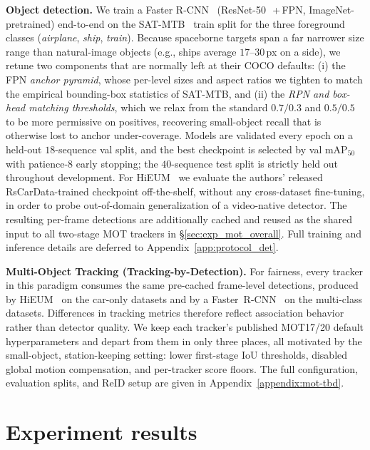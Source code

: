 \documentclass{article}
\newcommand{\subhead}[1]{\noindent\textbf{#1.}}
\begin{document}
\subhead{Object detection} We train a Faster R-CNN~\citep{ren2015fasterrcnn} (ResNet-50~\citep{he2016resnet}\,+\,FPN, ImageNet-pretrained)
end-to-end on the SAT-MTB~\citep{Li2023SATMTB} train split for the three foreground classes (\emph{airplane}, \emph{ship}, \emph{train}).
Because spaceborne targets span a far narrower size range than natural-image objects (e.g., ships average $17$--$30$\,px on a side), 
we retune two components that are normally left at their COCO defaults: 
(i) the FPN \emph{anchor pyramid}, whose per-level sizes and aspect ratios we tighten to match the empirical bounding-box statistics of SAT-MTB, 
and (ii) the \emph{RPN and box-head matching thresholds}, which we relax from the standard $0.7/0.3$ and $0.5/0.5$ to be more permissive on positives, 
recovering small-object recall that is otherwise lost to anchor under-coverage. Models are validated every epoch on a held-out $18$-sequence val split, 
and the best checkpoint is selected by val mAP$_{50}$ with patience-$8$ early stopping; 
the $40$-sequence test split is strictly held out throughout development. 
For HiEUM~\citep{Xiao2024HiEUM} we evaluate the authors' released RsCarData-trained checkpoint off-the-shelf,
without any cross-dataset fine-tuning, in order to probe out-of-domain generalization of a video-native detector.
The resulting per-frame detections are additionally cached and reused as the shared input to all two-stage MOT trackers in \S\ref{sec:exp_mot_overall}.
Full training and inference details are deferred to Appendix~\ref{app:protocol_det}.

\subhead{Multi-Object Tracking (Tracking-by-Detection)} For fairness, every tracker in this paradigm consumes the same
pre-cached frame-level detections, produced by HiEUM~\citep{Xiao2024HiEUM}
on the car-only datasets and by a Faster~R-CNN~\citep{ren2015fasterrcnn}
on the multi-class datasets. Differences in tracking metrics
therefore reflect association behavior rather than detector quality.
We keep each tracker's published MOT17/20 default hyperparameters
and depart from them in only three places, all motivated by the
small-object, station-keeping setting: lower first-stage IoU
thresholds, disabled global motion compensation, and per-tracker
score floors. The full configuration, evaluation splits, and ReID
setup are given in Appendix~\ref{appendix:mot-tbd}.

\section{Experiment results}
\end{document}
